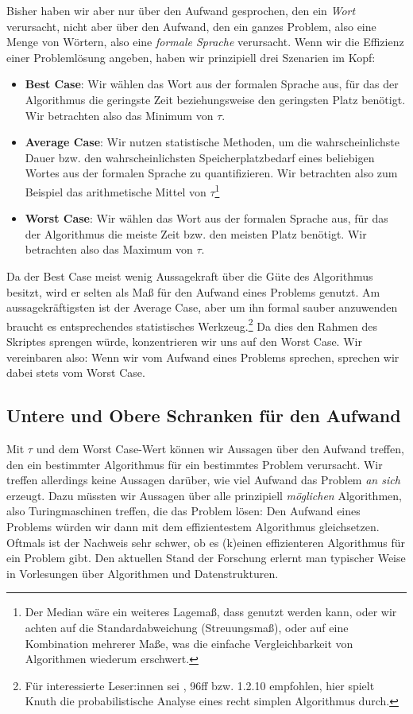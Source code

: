 Bisher haben wir aber nur über den Aufwand gesprochen,
den ein \emph{Wort} verursacht,
nicht aber über den Aufwand,
den ein ganzes Problem, also eine Menge von Wörtern,
also eine \emph{formale Sprache} verursacht.
Wenn wir die Effizienz einer Problemlösung angeben,
haben wir prinzipiell drei Szenarien im Kopf:
\begin{itemize}
    \item \textbf{Best Case}: Wir wählen das Wort aus der formalen Sprache aus,
        für das der Algorithmus die geringste Zeit
        beziehungsweise den geringsten Platz benötigt.
        Wir betrachten also das Minimum von $\tau$.
    \item \textbf{Average Case}: Wir nutzen statistische Methoden, um die wahrscheinlichste
        Dauer bzw. den wahrscheinlichsten Speicherplatzbedarf eines beliebigen Wortes aus
        der formalen Sprache zu quantifizieren.
        Wir betrachten also zum Beispiel das arithmetische Mittel von $\tau$\footnote{
            Der Median wäre ein weiteres Lagemaß, dass genutzt werden kann,
        oder wir achten auf die Standardabweichung (Streuungsmaß), oder auf eine Kombination 
        mehrerer Maße, was die einfache Vergleichbarkeit von Algorithmen wiederum erschwert.}
    \item \textbf{Worst Case}: Wir wählen das Wort aus der formalen Sprache aus,
        für das der Algorithmus die meiste Zeit bzw. den meisten Platz benötigt.
        Wir betrachten also das Maximum von $\tau$. 
\end{itemize} 

Da der Best Case meist wenig Aussagekraft über die Güte des Algorithmus besitzt,
wird er selten als Maß für den Aufwand eines Problems genutzt.
Am aussagekräftigsten ist der Average Case,
aber um ihn formal sauber anzuwenden braucht es
entsprechendes statistisches Werkzeug.\footnote{
    Für interessierte Leser:innen sei \cite{knuth1}, 96ff bzw. 1.2.10 empfohlen,
    hier spielt Knuth die probabilistische Analyse eines recht simplen Algorithmus durch.} 
Da dies den Rahmen des Skriptes sprengen würde,
konzentrieren wir uns auf den Worst Case.
Wir vereinbaren also: Wenn wir vom Aufwand eines Problems sprechen,
sprechen wir dabei stets vom Worst Case.

\subsection{Untere und Obere Schranken für den Aufwand}
Mit $\tau$ und dem Worst Case-Wert können wir Aussagen über den Aufwand treffen,
den ein bestimmter Algorithmus für ein bestimmtes Problem verursacht.
Wir treffen allerdings keine Aussagen darüber,
wie viel Aufwand das Problem \emph{an sich} erzeugt.
Dazu müssten wir Aussagen über alle prinzipiell \emph{möglichen} Algorithmen,
also Turingmaschinen treffen,
die das Problem lösen:
Den Aufwand eines Problems würden wir dann mit dem effizientestem Algorithmus gleichsetzen.
Oftmals ist der Nachweis sehr schwer,
ob es (k)einen effizienteren Algorithmus
für ein Problem gibt.
Den aktuellen Stand der Forschung erlernt man typischer Weise in Vorlesungen über
Algorithmen und Datenstrukturen.

